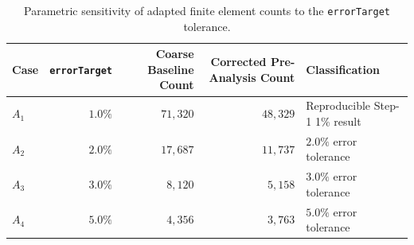\begin{table}[htbp]
\centering
\caption{Parametric sensitivity of adapted finite element counts to the \texttt{errorTarget} tolerance.}
\label{tab:error_target_sensitivity_pack}
\begin{tabular}{lrrrl}
\toprule
Case & \texttt{errorTarget} & Coarse Baseline Count & Corrected Pre-Analysis Count & Classification \\
\midrule
$A_1$ & $1.0\%$ & $71{,}320$ & $48{,}329$ & Reproducible Step-1 1\% result \\
$A_2$ & $2.0\%$ & $17{,}687$ & $11{,}737$ & $2.0\%$ error tolerance \\
$A_3$ & $3.0\%$ & $8{,}120$ & $5{,}158$ & $3.0\%$ error tolerance \\
$A_4$ & $5.0\%$ & $4{,}356$ & $3{,}763$ & $5.0\%$ error tolerance \\
\bottomrule
\end{tabular}
\end{table}
